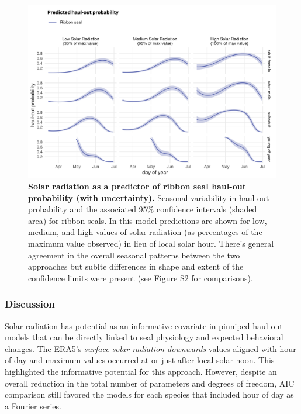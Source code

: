 \documentclass[fleqn,10pt,lineno]{wlpeerj} %
\begin{document}
\begin{figure}
\includegraphics[width=1\linewidth]{../figures/ssrd-ribbonPredSE-1} \caption{\textbf{Solar radiation as a predictor of ribbon seal haul-out probability (with uncertainty).} \linebreak Seasonal variability in haul-out probability and the associated 95\% confidence intervals (shaded area) for ribbon seals. In this model predictions are shown for low, medium, and high values of solar radiation (as percentages of the maximum value observed) in lieu of local solar hour. There's general agreement in the overall seasonal patterns between the two approaches but sublte differences in shape and extent of the confidence limits were present (see Figure S2 for comparisons).}\label{fig:ssrd-ribbonPredSE}
\end{figure}

\hypertarget{discussion-1}{%
\subsubsection{Discussion}\label{discussion-1}}

Solar radiation has potential as an informative covariate in pinniped haul-out
models that can be directly linked to seal physiology and expected behavioral
changes. The ERA5's \emph{surface solar radiation downwards} values aligned with hour
of day and maximum values occurred at or just after local solar noon. This
highlighted the informative potential for this approach. However, despite an
overall reduction in the total number of parameters and degrees of freedom, AIC
comparison still favored the models for each species that included hour of day
as a Fourier series.
\end{document}
